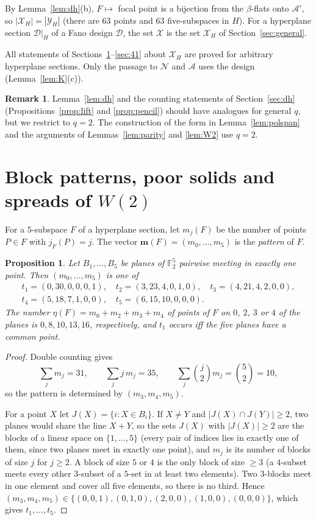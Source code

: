 \documentclass[11pt]{amsart}
\newtheorem{proposition}[theorem]{Proposition}
\theoremstyle{definition}
\newtheorem{remark}[theorem]{Remark}
\newcommand{\F}{\mathbb{F}}
\newcommand{\D}{\mathcal{D}}
\newcommand{\X}{\mathcal{X}}
\newcommand{\Y}{\mathcal{Y}}
\newcommand{\N}{\mathcal{N}}
\newcommand{\A}{\mathcal{A}}
\begin{document}
By Lemma~\ref{lem:dh}(b), $F\mapsto$ focal point is a bijection from the $\beta$-flats onto $\A'$, so $|\X_H|=|\Y_H|$ (there are $63$ points and $63$ five-subspaces in $H$). For a hyperplane section $\D|_H$ of a Fano design $\D$, the set $\X$ is the set $\X_H$ of Section~\ref{sec:general}.

All statements of Sections~\ref{sec:tools}--\ref{sec:41} about $\X_H$ are proved for arbitrary hyperplane sections. Only the passage to $\N$ and $\A$ uses the design (Lemma~\ref{lem:K}(c)).

\begin{remark}
Lemma~\ref{lem:dh} and the counting statements of Section~\ref{sec:dh} (Propositions~\ref{prop:lift} and \ref{prop:pencil}) should have analogues for general $q$, but we restrict to $q=2$. The construction of the form in Lemma~\ref{lem:polspan} and the arguments of Lemmas~\ref{lem:parity} and \ref{lem:W2} use $q=2$.
\end{remark}

\section{\texorpdfstring{Block patterns, poor solids and spreads of $W(2)$}{Block patterns, poor solids and spreads of W(2)}}\label{sec:tools}

For a $5$-subspace $F$ of a hyperplane section, let $m_j(F)$ be the number of points $P\in F$ with $j_F(P)=j$. The vector $\mathbf m(F)=(m_0,\dots,m_5)$ is the \emph{pattern} of $F$.

\begin{proposition}\label{prop:patterns}
Let $B_1,\dots,B_5$ be planes of $\F_2^5$ pairwise meeting in exactly one point. Then $(m_0,\dots,m_5)$ is one of
\begin{gather*}
t_1=(0,30,0,0,0,1),\quad t_2=(3,23,4,0,1,0),\quad t_3=(4,21,4,2,0,0),\\ t_4=(5,18,7,1,0,0),\quad t_5=(6,15,10,0,0,0).
\end{gather*}
The number $\eta(F)=m_0+m_2+m_3+m_4$ of points of $F$ on $0$, $2$, $3$ or $4$ of the planes is $0,8,10,13,16$, respectively, and $t_1$ occurs iff the five planes have a common point.
\end{proposition}
\begin{proof}
Double counting gives
\[
\sum_jm_j=31,\qquad \sum_jj\,m_j=35,\qquad \sum_j\binom j2m_j=\binom52=10,
\]
so the pattern is determined by $(m_3,m_4,m_5)$.

For a point $X$ let $J(X)=\{i:X\in B_i\}$. If $X\ne Y$ and $|J(X)\cap J(Y)|\ge2$, two planes would share the line $X+Y$, so the sets $J(X)$ with $|J(X)|\ge2$ are the blocks of a linear space on $\{1,\dots,5\}$ (every pair of indices lies in exactly one of them, since two planes meet in exactly one point), and $m_j$ is its number of blocks of size $j$ for $j\ge2$. A block of size $5$ or $4$ is the only block of size $\ge3$ (a $4$-subset meets every other $3$-subset of a $5$-set in at least two elements). Two $3$-blocks meet in one element and cover all five elements, so there is no third. Hence $(m_3,m_4,m_5)\in\{(0,0,1),(0,1,0),(2,0,0),(1,0,0),(0,0,0)\}$, which gives $t_1,\dots,t_5$.
\end{proof}
\end{document}
